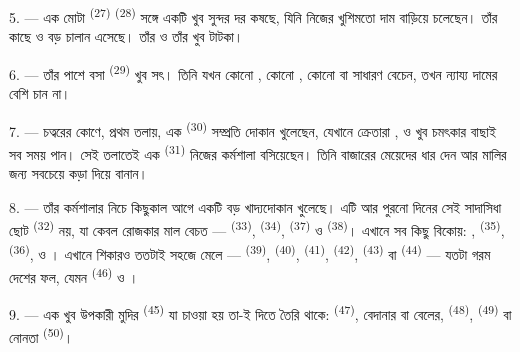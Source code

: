 5. --- এক মোটা  \textsuperscript{(27)} 
\textsuperscript{(28)} সঙ্গে একটি খুব সুন্দর  দর কষছে, যিনি নিজের
খুশিমতো দাম বাড়িয়ে চলেছেন। তাঁর কাছে  ও
 বড় চালান এসেছে। তাঁর  ও তাঁর  খুব
টাটকা।

\VUsaut{4.0mm}
\VUsaut{3.0mm}

6. --- তাঁর পাশে বসা  \textsuperscript{(29)} খুব সৎ। তিনি
যখন কোনো , কোনো , কোনো  বা সাধারণ
 বেচেন, তখন ন্যায্য দামের বেশি চান না।

7. --- চত্বরের কোণে, প্রথম তলায়, এক 
\textsuperscript{(30)} সম্প্রতি দোকান খুলেছেন, যেখানে ক্রেতারা
,  ও  খুব চমৎকার
বাছাই সব সময় পান। সেই তলাতেই এক  \textsuperscript{(31)}
নিজের কর্মশালা বসিয়েছেন। তিনি বাজারের মেয়েদের  ধার দেন আর মালির
জন্য সবচেয়ে কড়া  দিয়ে  বানান।

\VUsaut{4.0mm}
\VUsaut{3.0mm}

8. --- তাঁর কর্মশালার নিচে কিছুকাল আগে একটি বড় খাদ্যদোকান খুলেছে। এটি আর
পুরনো দিনের সেই সাদাসিধা ছোট  \textsuperscript{(32)} নয়, যা
কেবল রোজকার মাল বেচত ---  \textsuperscript{(33)}, 
\textsuperscript{(34)},  \textsuperscript{(37)} ও 
\textsuperscript{(38)}। এখানে সব কিছু বিকোয়: ,
 \textsuperscript{(35)},  \textsuperscript{(36)},
 ও । এখানে শিকারও
ততটাই সহজে মেলে ---  \textsuperscript{(39)}, 
\textsuperscript{(40)},  \textsuperscript{(41)}, 
\textsuperscript{(42)},  \textsuperscript{(43)} বা
 \textsuperscript{(44)} --- যতটা গরম দেশের ফল, যেমন
 \textsuperscript{(46)} ও ।

9. --- এক খুব উপকারী মুদির  \textsuperscript{(45)} যা চাওয়া হয়
তা-ই দিতে তৈরি থাকে:  \textsuperscript{(47)}, বেদানার বা বেলের,
 \textsuperscript{(48)},  \textsuperscript{(49)} বা
নোনতা  \textsuperscript{(50)}।

